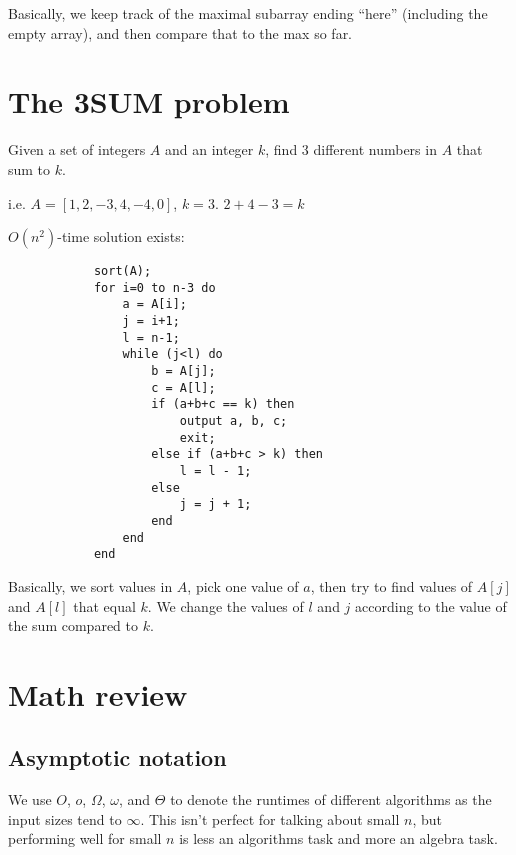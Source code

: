         Basically, we keep track of the maximal subarray ending ``here''
        (including the empty array), and then compare that to the max so far.

    \section{The 3SUM problem}
        Given a set of integers $A$ and an integer $k$, find $3$ different
        numbers in $A$ that sum to $k$.

        i.e. $A = [1, 2, -3, 4, -4, 0]$, $k = 3$. $2 + 4 - 3 = k$

        $O(n^2)$-time solution exists:
        \begin{verbatim}
            sort(A);
            for i=0 to n-3 do
                a = A[i];
                j = i+1;
                l = n-1;
                while (j<l) do
                    b = A[j];
                    c = A[l];
                    if (a+b+c == k) then
                        output a, b, c;
                        exit;
                    else if (a+b+c > k) then
                        l = l - 1;
                    else
                        j = j + 1;
                    end
                end
            end
        \end{verbatim}
        Basically, we sort values in $A$, pick one value of $a$, then try to
        find values of $A[j]$ and $A[l]$ that equal $k$. We change the values
        of $l$ and $j$ according to the value of the sum compared to $k$.

    \section{Math review}
        \subsection{Asymptotic notation}
            We use $O$, $o$, $\Omega$, $\omega$, and $\Theta$ to denote the
            runtimes of different algorithms as the input sizes tend to
            $\infty$. This isn't perfect for talking about small $n$, but
            performing well for small $n$ is less an algorithms task and more an
            algebra task.

